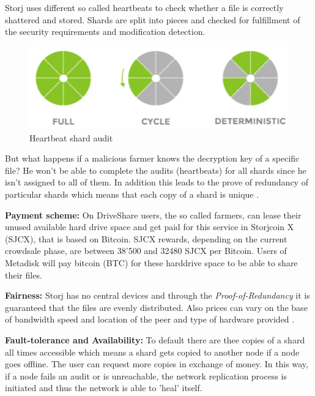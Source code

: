 Storj uses different so called heartbeats to check whether a file is correctly shattered and stored. Shards are split into pieces and checked for fulfillment of the security requirements and modification detection. 

	\begin{figure}[ht]
		\begin{center}
		\includegraphics[scale=0.8]{Talk5/storj_heartbeat.PNG}
		\end{center}
		\caption{Heartbeat shard audit \cite{storj:PDF}}
		\label{storj_heartbeat}
	\end{figure}

But what happens if a malicious farmer knows the decryption key of a specific file? He won't be able to complete the audits (heartbeats) for all shards since he isn't assigned to all of them. In addition this leads to the prove of redundancy of particular shards which means that each copy of a shard is unique \cite{storj:PDF}.

\textbf{Payment scheme:} On DriveShare users, the so called farmers, can lease their unused available hard drive space and get paid for this service in Storjcoin X (SJCX), that is based on Bitcoin. SJCX rewards, depending on the current crowdsale phase, are between 38'500 and 32480 SJCX per Bitcoin\cite{storj:crowdsale}. Users of Metadisk will pay bitcoin (BTC) for these harddrive space to be able to share their files.

\textbf{Fairness:} Storj has no central devices and through the \textit{Proof-of-Redundancy} it is guaranteed that the files are evenly distributed. Also prices can vary on the base of bandwidth speed and location of the peer and type of hardware provided \cite{storj:PDF}.

\textbf{Fault-tolerance and Availability:} To default there are thee copies of a shard all times accessible which means a shard gets copied to another node if a node goes offline. The user can request more copies in exchange of money. In this way, if a node fails an audit or is unreachable, the network replication process is initiated and thus the network is able to 'heal' itself.

